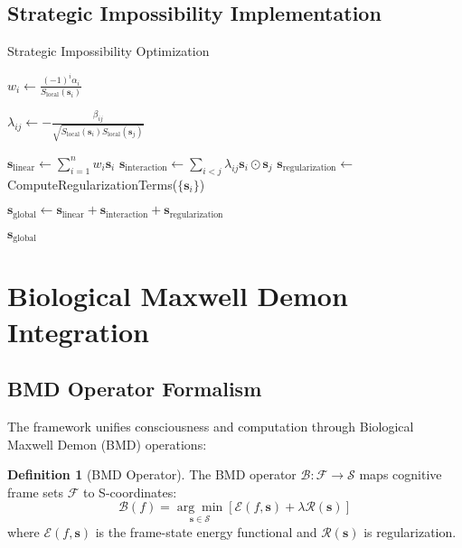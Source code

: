 \documentclass[11pt]{article}
\theoremstyle{definition}
\newtheorem{definition}[theorem]{Definition}
\theoremstyle{remark}
\begin{document}
\subsection{Strategic Impossibility Implementation}

\begin{algorithm}
\caption{Strategic Impossibility Optimization}
\begin{algorithmic}[1]
        \State $w_i \gets \frac{(-1)^i \alpha_i}{S_{\text{local}}(\mathbf{s}_i)}$ 
    \EndFor
    
        \State $\lambda_{ij} \gets -\frac{\beta_{ij}}{\sqrt{S_{\text{local}}(\mathbf{s}_i) S_{\text{local}}(\mathbf{s}_j)}}$
    \EndFor
    
    \State $\mathbf{s}_{\text{linear}} \gets \sum_{i=1}^n w_i \mathbf{s}_i$
    \State $\mathbf{s}_{\text{interaction}} \gets \sum_{i<j} \lambda_{ij} \mathbf{s}_i \odot \mathbf{s}_j$
    \State $\mathbf{s}_{\text{regularization}} \gets$ ComputeRegularizationTerms($\{\mathbf{s}_i\}$)
    
    \State $\mathbf{s}_{\text{global}} \gets \mathbf{s}_{\text{linear}} + \mathbf{s}_{\text{interaction}} + \mathbf{s}_{\text{regularization}}$
    
    \State \Return $\mathbf{s}_{\text{global}}$ 
\EndProcedure
\end{algorithmic}
\end{algorithm}

\section{Biological Maxwell Demon Integration}

\subsection{BMD Operator Formalism}

The framework unifies consciousness and computation through Biological Maxwell Demon (BMD) operations:

\begin{definition}[BMD Operator]
The BMD operator $\mathcal{B}: \mathcal{F} \to \mathcal{S}$ maps cognitive frame sets $\mathcal{F}$ to S-coordinates:
\begin{equation}
\mathcal{B}(f) = \underset{\mathbf{s} \in \mathcal{S}}{\arg\min} \left[ \mathcal{E}(f, \mathbf{s}) + \lambda \mathcal{R}(\mathbf{s}) \right]
\end{equation}
where $\mathcal{E}(f, \mathbf{s})$ is the frame-state energy functional and $\mathcal{R}(\mathbf{s})$ is regularization.
\end{definition}
\end{document}
